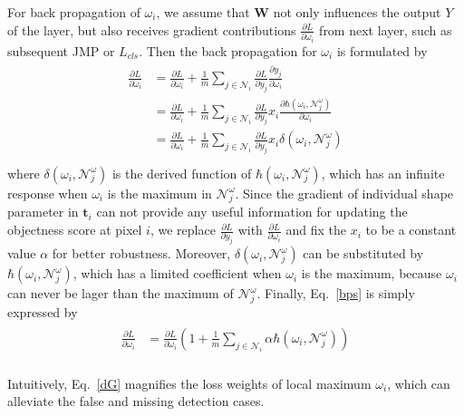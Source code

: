 For back propagation of $\omega_i$, we assume that $\mathbf{W}$ not only influences the output $Y$ of the layer, but also receives gradient contributions $\frac{\partial L}{\partial \omega_{i}}$ from next layer, such as subsequent JMP or $L_{cls}$.
Then the back propagation for $\omega_{i}$ is formulated by
%
\begin{eqnarray}\label{bps}
\begin{aligned}
\frac{\partial L}{\partial \omega_{i}}&=\frac{\partial L}{\partial \omega_{i}}+\frac{1}{m}\sum_{j\in\mathcal{N}_{i}}\frac{\partial L}{\partial y_{j}}\frac{\partial y_{j}}{\partial \omega_{i}}\\
&=\frac{\partial L}{\partial \omega_{i}}+\frac{1}{m}\sum_{j\in\mathcal{N}_{i}}\frac{\partial L}{\partial y_{j}}x_{i}\frac{\partial \hbar(\omega_{i},\mathcal{N}^{\omega}_{j})}{\partial \omega_{i}}\\
&=\frac{\partial L}{\partial \omega_{i}}+\frac{1}{m}\sum_{j\in\mathcal{N}_{i}}\frac{\partial L}{\partial y_{j}}x_{i}\delta(\omega_{i},\mathcal{N}^{\omega}_{j})\\
\end{aligned}
\end{eqnarray}
where $\delta(\omega_{i},\mathcal{N}^{\omega}_{j})$ is the derived function of $\hbar(\omega_{i},\mathcal{N}^{\omega}_{j})$, which has an infinite response when $\omega_{i}$ is the maximum in $\mathcal{N}^{\omega}_{j}$.
Since the gradient of individual shape parameter in $\mathbf{t}_i$ can not provide any useful information for updating the objectness score at pixel $i$, we replace $\frac{\partial L}{\partial y_{j}}$ with $\frac{\partial L}{\partial \omega_{i}}$ and fix the $x_i$ to be a constant value $\alpha$ for better robustness.
Moreover, $\delta(\omega_{i},\mathcal{N}^{\omega}_{j})$ can be substituted by $\hbar(\omega_{i},\mathcal{N}^{\omega}_{j})$, which has a limited coefficient when $\omega_{i}$ is the maximum, because $\omega_i$ can never be lager than the maximum of $\mathcal{N}^{\omega}_{j}$.
Finally, Eq.~\ref{bps} is simply expressed by
\begin{eqnarray}\label{dG}
\begin{aligned}
\frac{\partial L}{\partial \omega_{i}}&=\frac{\partial L}{\partial \omega_{i}}(1+\frac{1}{m}\sum_{j\in\mathcal{N}_{i}}\alpha \hbar(\omega_{i},\mathcal{N}^{\omega}_{j}))\\
\end{aligned}
\end{eqnarray}

Intuitively, Eq.~\ref{dG} magnifies the loss weights of local maximum $\omega_{i}$, which can alleviate the false and missing detection cases.

